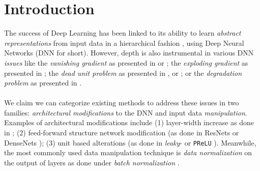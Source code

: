 \section{Introduction}\label{sec:introduction}
The success of Deep Learning has been linked to its ability to learn \emph{abstract representations} from input data in a hierarchical fashion  \cite{LeCun06atutorial,ramachandranEtAl2017SearchingForActivationFunctions}, using Deep Neural Networks (DNN for short). However, depth is also instrumental in various DNN \emph{issues} like the \emph{vanishing gradient} as presented in \cite{vanishing1} or \cite{vanishing2}; the \emph{exploding gradient} as presented in \cite{exploding}; the \emph{dead unit problem} as presented in \cite{leaky},\cite{whyreludie} or \cite{whenneuronsfail}; or the \emph{degradation problem} as presented in \cite{resnet}. 
\\\\
We claim we can categorize existing methods to address these issues in two families: \emph{architectural modifications} to the DNN and input data \emph{manipulation}. Examples of architectural modifications include (1) layer-width increase as done in \cite{wideresnet,inceptionv1}; (2) feed-forward structure network modification (as done in ResNets \cite{resnet} or DenseNets \cite{densenet}); (3) unit based alterations (as done in \emph{leaky}-\ReLU \cite{leaky} or \texttt{PReLU} \cite{prelu}). Meanwhile, the most commonly used data manipulation technique is \emph{data normalization} on the output of layers as done under \emph{batch normalization} \cite{batchnorm}.  
\\\\

